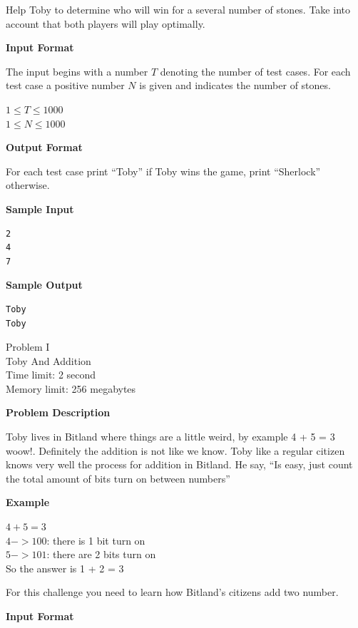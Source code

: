 \documentclass[11pt]{article}
\begin{document}
Help Toby to determine who will win for a several number of stones. Take into account that both players will play optimally.

\textbf{\large Input Format}

The input begins with a number $T$ denoting the number of test cases. For each
test case a positive number $N$ is given and indicates the number of stones.

$ 1 \le T \le 1000 $ \\
$ 1 \le N \le 1000 $

\textbf{\large Output Format}

For each test case print ``Toby'' if Toby wins the game, print ``Sherlock'' otherwise.

\textbf{\large Sample Input}

\begin{verbatim}
2
4
7
\end{verbatim}

\textbf{\large Sample Output}

\begin{verbatim}
Toby
Toby
\end{verbatim}

\newpage

        \begin{center}
            {\LARGE Problem I}\\
            {\Large Toby And Addition}\\
            {Time limit: 2 second}\\
            {Memory limit: 256 megabytes}
        \end{center}\textbf{\large Problem Description}

Toby lives in Bitland where things are a little weird,
by example 4 + 5 = 3 woow!. Definitely the addition is not like we know.
Toby like a regular citizen knows very well the process for addition in Bitland.
He say, ``Is easy, just count the total amount of bits turn on between numbers''

\textbf{\large Example}

$4 + 5 = 3$ \\
$4 -> 100$: there is 1 bit turn on \\
$5 -> 101$: there are 2 bits turn on \\

So the answer is 1 + 2 = 3

For this challenge you need to learn how Bitland's citizens add two number.

\textbf{\large Input Format}
\end{document}
